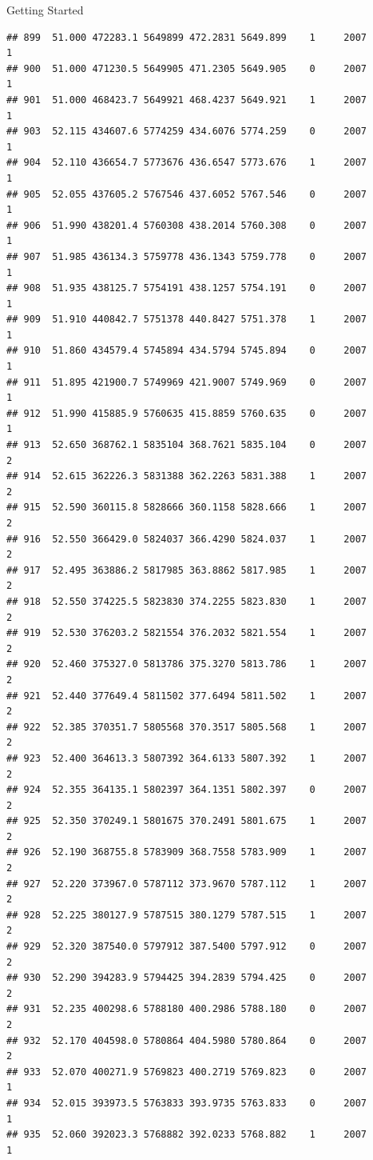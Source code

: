 \documentclass[
  ignorenonframetext,
]{beamer}
\begin{document}
\begin{frame}[fragile]{Getting Started}
\begin{verbatim}
## 899  51.000 472283.1 5649899 472.2831 5649.899    1     2007        1
## 900  51.000 471230.5 5649905 471.2305 5649.905    0     2007        1
## 901  51.000 468423.7 5649921 468.4237 5649.921    1     2007        1
## 903  52.115 434607.6 5774259 434.6076 5774.259    0     2007        1
## 904  52.110 436654.7 5773676 436.6547 5773.676    1     2007        1
## 905  52.055 437605.2 5767546 437.6052 5767.546    0     2007        1
## 906  51.990 438201.4 5760308 438.2014 5760.308    0     2007        1
## 907  51.985 436134.3 5759778 436.1343 5759.778    0     2007        1
## 908  51.935 438125.7 5754191 438.1257 5754.191    0     2007        1
## 909  51.910 440842.7 5751378 440.8427 5751.378    1     2007        1
## 910  51.860 434579.4 5745894 434.5794 5745.894    0     2007        1
## 911  51.895 421900.7 5749969 421.9007 5749.969    0     2007        1
## 912  51.990 415885.9 5760635 415.8859 5760.635    0     2007        1
## 913  52.650 368762.1 5835104 368.7621 5835.104    0     2007        2
## 914  52.615 362226.3 5831388 362.2263 5831.388    1     2007        2
## 915  52.590 360115.8 5828666 360.1158 5828.666    1     2007        2
## 916  52.550 366429.0 5824037 366.4290 5824.037    1     2007        2
## 917  52.495 363886.2 5817985 363.8862 5817.985    1     2007        2
## 918  52.550 374225.5 5823830 374.2255 5823.830    1     2007        2
## 919  52.530 376203.2 5821554 376.2032 5821.554    1     2007        2
## 920  52.460 375327.0 5813786 375.3270 5813.786    1     2007        2
## 921  52.440 377649.4 5811502 377.6494 5811.502    1     2007        2
## 922  52.385 370351.7 5805568 370.3517 5805.568    1     2007        2
## 923  52.400 364613.3 5807392 364.6133 5807.392    1     2007        2
## 924  52.355 364135.1 5802397 364.1351 5802.397    0     2007        2
## 925  52.350 370249.1 5801675 370.2491 5801.675    1     2007        2
## 926  52.190 368755.8 5783909 368.7558 5783.909    1     2007        2
## 927  52.220 373967.0 5787112 373.9670 5787.112    1     2007        2
## 928  52.225 380127.9 5787515 380.1279 5787.515    1     2007        2
## 929  52.320 387540.0 5797912 387.5400 5797.912    0     2007        2
## 930  52.290 394283.9 5794425 394.2839 5794.425    0     2007        2
## 931  52.235 400298.6 5788180 400.2986 5788.180    0     2007        2
## 932  52.170 404598.0 5780864 404.5980 5780.864    0     2007        2
## 933  52.070 400271.9 5769823 400.2719 5769.823    0     2007        1
## 934  52.015 393973.5 5763833 393.9735 5763.833    0     2007        1
## 935  52.060 392023.3 5768882 392.0233 5768.882    1     2007        1

\end{verbatim}
\end{frame}
\end{document}
